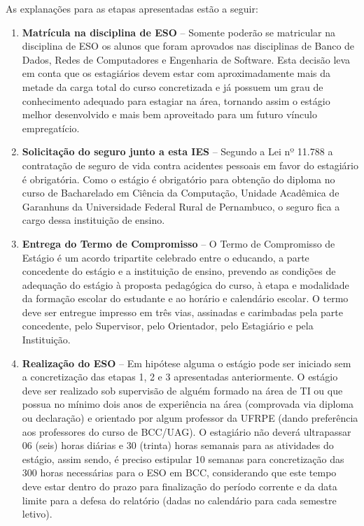 \documentclass[
	12pt,				%
	openright,			%
  oneside,     %
	a4paper,			%
	chapter=TITLE,		%
	english,			%
	french,				%
	spanish,			%
	brazil				%
	]{abntex2}
\begin{document}
As explanações para as etapas apresentadas estão a seguir:

\begin{enumerate}
    \item \textbf{Matrícula na disciplina de ESO} – Somente poderão se matricular na disciplina de ESO os alunos que foram aprovados nas disciplinas de Banco de Dados, Redes de Computadores e Engenharia de Software. Esta decisão leva em conta que os estagiários devem estar com aproximadamente mais da metade da carga total do curso concretizada e já possuem um grau de conhecimento adequado para estagiar na área, tornando assim o estágio melhor desenvolvido e mais bem aproveitado para um futuro vínculo empregatício.
    \item \textbf{Solicitação do seguro junto a esta IES} – Segundo a Lei nº 11.788 a contratação de seguro de vida contra acidentes pessoais em favor do estagiário é obrigatória. Como o estágio é obrigatório para obtenção do diploma no curso de Bacharelado em Ciência da Computação, Unidade Acadêmica de Garanhuns da Universidade Federal Rural de Pernambuco, o seguro fica a cargo dessa instituição de ensino.
    \item \textbf{Entrega do Termo de Compromisso} – O Termo de Compromisso de Estágio é um acordo tripartite celebrado entre o educando, a parte concedente do estágio e a instituição de ensino, prevendo as condições de adequação do estágio à proposta pedagógica do  curso, à etapa e modalidade da formação escolar  do  estudante  e ao horário e calendário escolar. O termo deve ser entregue impresso em três vias, assinadas e carimbadas pela parte concedente, pelo  Supervisor,  pelo  Orientador, pelo Estagiário e pela Instituição.
    \item \textbf{Realização do ESO} – Em hipótese alguma o estágio pode ser iniciado sem a concretização das etapas 1, 2 e 3 apresentadas anteriormente. O estágio deve ser realizado sob supervisão de alguém formado na área de TI ou que possua no mínimo dois anos de experiência na área (comprovada via diploma ou declaração) e orientado por algum professor da UFRPE (dando preferência aos professores do curso de BCC/UAG). O estagiário não deverá ultrapassar 06 (seis) horas diárias e 30 (trinta) horas semanais para as atividades do estágio, assim sendo, é preciso estipular 10 semanas para concretização das 300 horas necessárias para o ESO em BCC, considerando que este tempo deve estar dentro do prazo para finalização do período corrente e da data limite para a defesa do relatório (dadas no calendário para cada semestre letivo).

\end{enumerate}
\end{document}
